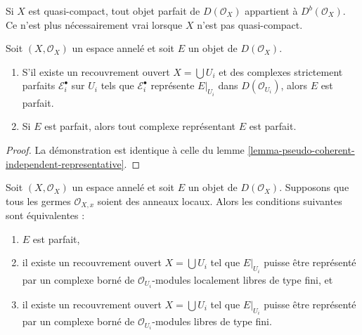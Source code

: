 \noindent
Si $X$ est quasi-compact, tout objet parfait de $D(\mathcal{O}_X)$ appartient à $D^b(\mathcal{O}_X)$. Ce n'est plus nécessairement vrai lorsque $X$ n'est pas quasi-compact.

\begin{lemma}

\label{lemma-perfect-independent-representative}
Soit $(X, \mathcal{O}_X)$ un espace annelé et soit $E$ un objet de $D(\mathcal{O}_X)$.
\begin{enumerate}
\item S'il existe un recouvrement ouvert $X = \bigcup U_i$ et des complexes strictement parfaits $\mathcal{E}_i^\bullet$ sur $U_i$ tels que $\mathcal{E}_i^\bullet$ représente $E|_{U_i}$ dans $D(\mathcal{O}_{U_i})$, alors $E$ est parfait.
\item Si $E$ est parfait, alors tout complexe représentant $E$ est parfait.
\end{enumerate}

\end{lemma}

\begin{proof}
La démonstration est identique à celle du lemme \ref{lemma-pseudo-coherent-independent-representative}.
\end{proof}

\begin{lemma}

\label{lemma-perfect-on-locally-ringed}

Soit $(X, \mathcal{O}_X)$ un espace annelé et soit $E$ un objet de
$D(\mathcal{O}_X)$. Supposons que tous les germes $\mathcal{O}_{X, x}$
soient des anneaux locaux. Alors les conditions suivantes sont équivalentes :

\begin{enumerate}

\item  $E$ est parfait,
\item il existe un recouvrement ouvert $X = \bigcup U_i$ tel que
$E|_{U_i}$ puisse être représenté par un complexe borné de $\mathcal{O}_{U_i}$-modules localement libres de type fini, et
\item il existe un recouvrement ouvert $X = \bigcup U_i$ tel que
$E|_{U_i}$ puisse être représenté par un complexe borné de $\mathcal{O}_{U_i}$-modules libres de type fini.

\end{enumerate}

\end{lemma}

